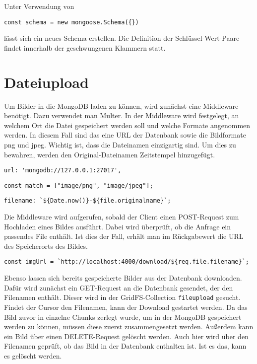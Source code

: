 Unter Verwendung von 

\begin{lstlisting}[caption=Erstellen eines neuen Schemas, label=lst:schema]
    const schema = new mongoose.Schema({})
\end{lstlisting}

lässt sich ein neues Schema erstellen. Die Definition der Schlüssel-Wert-Paare findet innerhalb der geschwungenen Klammern statt.

\section{Dateiupload}
Um Bilder in die MongoDB laden zu können, wird zunächst eine Middleware benötigt. Dazu verwendet man Multer. In der Middleware wird festgelegt, an welchem Ort die Datei gespeichert werden soll und welche Formate angenommen werden. In diesem Fall sind das eine URL der Datenbank sowie die Bildformate png und jpeg. Wichtig ist, dass die Dateinamen einzigartig sind. Um dies zu bewahren, werden den Original-Dateinamen Zeitstempel hinzugefügt.

\begin{lstlisting}[caption=Zuweisen der URL der Datenbank, label=lst:url]
    url: 'mongodb://127.0.0.1:27017',
\end{lstlisting}

\begin{lstlisting}[caption=Festlegen der zugelassenen Dateiformate, label=lst:dateiformate]
    const match = ["image/png", "image/jpeg"];
\end{lstlisting}

\begin{lstlisting}[caption=Festlegen des Dateinamens mit Zeitstempel, label=lst:dateiname]
    filename: `${Date.now()}-${file.originalname}`;
\end{lstlisting}

Die Middleware wird aufgerufen, sobald der Client einen POST-Request zum Hochladen eines Bildes ausführt. Dabei wird überprüft, ob die Anfrage ein passendes File enthält. Ist dies der Fall, erhält man im Rückgabewert die URL des Speicherorts des Bildes.

\begin{lstlisting}[caption=Speicherort des Bildes, label=lst:speicherortbild]
    const imgUrl = `http://localhost:4000/download/${req.file.filename}`;
\end{lstlisting}

Ebenso lassen sich bereits gespeicherte Bilder aus der Datenbank downloaden. Dafür wird zunächst ein GET-Request an die Datenbank gesendet, der den Filenamen enthält. Dieser wird in der GridFS-Collection \texttt{fileupload} gesucht. Findet der Cursor den Filenamen, kann der Download gestartet werden. Da das Bild zuvor in einzelne Chunks zerlegt wurde, um in der MongoDB gespeichert werden zu können, müssen diese zuerst zusammengesetzt werden. 
Außerdem kann ein Bild über einen DELETE-Request gelöscht werden. Auch hier wird über den Filenamen geprüft, ob das Bild in der Datenbank enthalten ist. Ist es das, kann es gelöscht werden.
